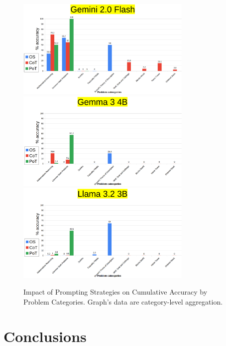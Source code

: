 \documentclass[12pt]{article}
\begin{document}
\begin{figure}[H]
    \centering
            \includegraphics[width=0.75\textwidth]{MyGemini2Flash.png}
            \includegraphics[width=0.75\textwidth]{MyGemma3_8BBenchmarks.png}
            \includegraphics[width=0.75\textwidth]{MyLlama3_2_3B.png}
    \caption[My benchmark: accuracy by question category]{Impact of Prompting Strategies on Cumulative Accuracy by Problem Categories. Graph's data are category-level aggregation.}
    \label{fig:finalBench}
    \end{figure} 

\clearpage
\section{Conclusions}
\end{document}
